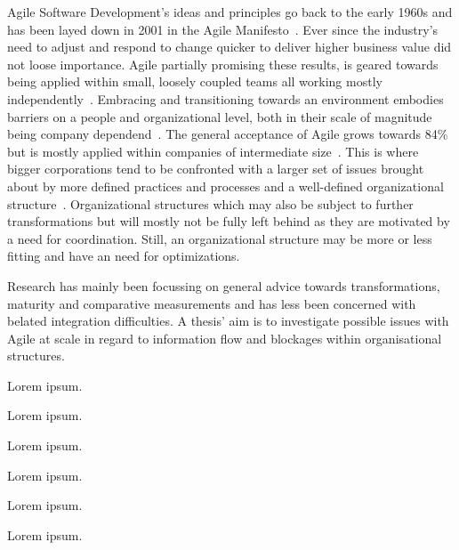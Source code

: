 \documentclass[times, 10pt,twocolumn]{article}
\begin{document}

	Agile Software Development’s ideas and principles go back to the early 1960s and has been layed down in 2001 in the Agile Manifesto~\cite{beck2001agile}. Ever since the industry’s need to adjust and respond to change quicker to deliver higher business value did not loose importance. Agile partially promising these results, is geared towards being applied within small, loosely coupled teams all working mostly independently~\cite{stober2009agile}. Embracing and transitioning towards an environment embodies barriers on a people and organizational level, both in their scale of magnitude being company dependend~\cite{schiel2009enterprise}. The general acceptance of Agile grows towards 84\% but is mostly applied within companies of intermediate size~\cite{7thagilesur}. This is where bigger corporations tend to be confronted with a larger set of issues brought about by more defined practices and processes and a well-defined organizational structure~\cite{schiel2009enterprise}. Organizational structures which may also be subject to further transformations but will mostly not be fully left behind as they are motivated by a need for coordination. Still, an organizational structure may be more or less fitting and have an need for optimizations.

	Research has mainly been focussing on general advice towards transformations, maturity and comparative measurements and has less been concerned with belated integration difficulties. A thesis’ aim is to investigate possible issues with Agile at scale in regard to information flow and blockages within organisational structures.


	Lorem ipsum.


	Lorem ipsum.


	Lorem ipsum.


	Lorem ipsum.


	Lorem ipsum.


	Lorem ipsum.

	
	
\end{document}
